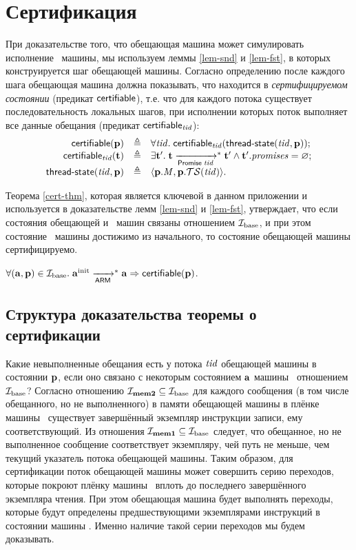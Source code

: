\section{Сертификация}
\label{sec:app:cert}

При доказательстве того, что обещающая машина может симулировать исполнение \ARMt~машины,
мы используем леммы \ref{lem-snd} и \ref{lem-fst}, в которых конструируется шаг обещающей машины.
Согласно определению после каждого шага обещающая машина должна показывать, что находится в \emph{сертифицируемом состоянии}
(предикат $\mathsf{certifiable}$), т.е. что для каждого потока существует последовательность
локальных шагов, при исполнении которых поток
выполняет все данные обещания (предикат $\mathsf{certifiable}_{\mathit{tid}}$):
\[\begin{array}{r l l}
\mathsf{certifiable}(\mathbf{p}) & \triangleq & \forall \mathit{tid}. \; \mathsf{certifiable}_{\mathit{tid}}(\textup{\sf thread-state}(\mathit{tid},\mathbf{p})); \\
\mathsf{certifiable}_{\mathit{tid}}(\mathbf{t}) & \triangleq & \exists \mathbf{t}'. \; \mathbf{t} \xrightarrow[\mathsf{Promise} \; \mathit{tid}]{}^{*} \mathbf{t}' \land \mathbf{t}'.\mathit{promises} = \varnothing; \\
\textup{\sf thread-state}(\mathit{tid}, \mathbf{p}) & \triangleq & \langle \mathbf{p}.\mathit{M}, \mathbf{p}.\mathcal{TS}(\mathit{tid}) \rangle. \\
\end{array}\]

Теорема \ref{cert-thm}, которая является ключевой в данном приложении и используется в доказательстве
лемм \ref{lem-snd} и \ref{lem-fst}, утверждает,
что если состояния обещающей и \ARMt~машин связаны отношением $\mathcal{I}_{\textup{\rm base}}$, и при этом состояние \ARMt~машины
достижимо из начального, то состояние обещающей машины сертифицируемо.
\begin{theorem}
\label{cert-thm}
$\forall (\mathbf{a}, \mathbf{p}) \in \mathcal{I}_{\textup{\rm base}}. \; \mathbf{a}^{\rm init} \xrightarrow[\mathsf{ARM}]{}^{*} \mathbf{a} \Rightarrow \mathsf{certifiable}(\mathbf{p})$.
\end{theorem}

\subsection{Структура доказательства теоремы о сертификации}

Какие невыполненные обещания есть у потока $\mathit{tid}$ обещающей машины в состоянии $\mathbf{p}$,
если оно связано с некоторым состоянием $\mathbf{a}$ машины \ARMt~отношением $\mathcal{I}_{\textup{\rm base}}$?
Согласно отношению $\mathcal{I}_{\rm \bf mem2} \subseteq \mathcal{I}_{\textup{\rm base}}$ для каждого сообщения
(в том числе обещанного, но не выполненного) в памяти обещающей машины
в плёнке машины \ARMt~существует завершённый экземпляр инструкции записи, ему
соответствующий. Из отношения $\mathcal{I}_{\rm \bf mem1} \subseteq \mathcal{I}_{\textup{\rm base}}$ следует, что
обещанное, но не выполненное сообщение соответствует экземпляру, чей путь не меньше,
чем текущий указатель потока обещающей машины.
Таким образом, для сертификации поток обещающей машины может совершить серию переходов,
которые покроют плёнку машины \ARMt~вплоть до последнего завершённого экземпляра чтения.
При этом обещающая машина будет выполнять переходы, которые будут определены предшествующими
экземплярами инструкций в состоянии машины \ARMt.
Именно наличие такой серии переходов мы будем доказывать.

